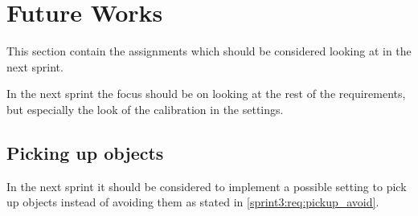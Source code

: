 \section{Future Works}
This section contain the assignments which should be considered looking at in the next sprint.

In the next sprint the focus should be on looking at the rest of the requirements, but especially the look of the calibration in the settings.


\subsection{Picking up objects}
In the next sprint it should be considered to implement a possible setting to pick up objects instead of avoiding them as stated in \cref{sprint3:req:pickup_avoid}.
